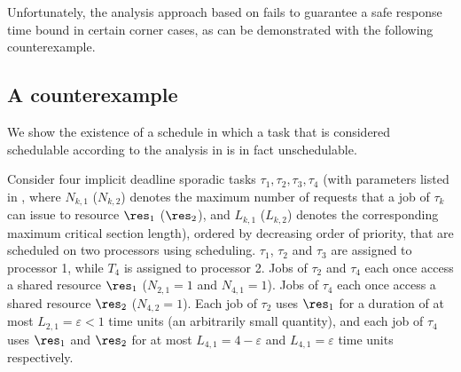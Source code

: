 Unfortunately, the analysis approach based on  fails to guarantee a safe response time bound in certain corner cases, as can be demonstrated with the following counterexample.

\subsection{A counterexample}
\label{sec:counterexample}

We show the existence of a schedule in which a task that is considered schedulable according to the analysis in \cite{lakshmanan-2009} is in fact unschedulable.




Consider four implicit deadline sporadic tasks ${\tau_1, \tau_2, \tau_3, \tau_4}$ (with parameters listed in , where $N_{k,1}$ ($N_{k,2}$) denotes the maximum number of requests that a job of $\tau_k$ can issue to resource $\res_1$ ($\res_2$), and $L_{k,1}$ ($L_{k,2}$) denotes the corresponding maximum critical section length), ordered by decreasing order of priority, that are scheduled on two processors using \pfp scheduling. $\tau_1$, $\tau_2$ and $\tau_3$ are assigned to processor 1, while $T_4$ is assigned to processor 2. Jobs of $\tau_2$ and $\tau_4$   each once access a shared resource $\res_1$  ($N_{2,1} = 1$ and $N_{4,1} = 1$). Jobs of $\tau_4$ each once access a shared resource $\res_2$ ($N_{4,2} = 1$). Each job of $\tau_2$ uses $\res_1$ for a duration of at most $L_{2,1} = \varepsilon < 1$ time units (an arbitrarily small quantity), and each job of $\tau_4$ uses $\res_1$ and $\res_2$ for at most $L_{4,1} = 4-\varepsilon$ and $L_{4,1} = \varepsilon$ time units respectively. 

